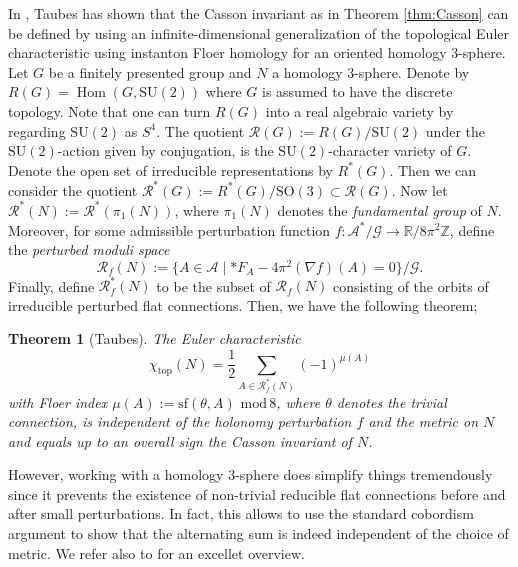 \documentclass[11pt,colorinlistoftodos]{amsart}
\numberwithin{equation}{subsection}
\theoremstyle{plain}
\newtheorem{thm}{Theorem}[subsection]
\theoremstyle{definition}
\theoremstyle{remark}
\newcommand{\R}{\mathbb{R}}
\newcommand{\Z}{\mathbb{Z}}
\newcommand{\calR}{\mathcal{R}}
\DeclareMathOperator{\Hom}{Hom}
\newcommand{\calA}{\mathcal{A}}
\begin{document}
In \cite{Taubes1990}, Taubes has shown that the Casson invariant as in Theorem \ref{thm:Casson} can be defined by using an infinite-dimensional generalization of the topological Euler characteristic using instanton Floer homology for an oriented homology 3-sphere. Let $G$ be a finitely presented group and $N$ a homology 3-sphere. Denote by $R(G)=\Hom(G,\mathrm{SU}(2))$ where $G$ is assumed to have the discrete topology. Note that one can turn $R(G)$ into a real algebraic variety by regarding $\mathrm{SU}(2)$ as $S^4$. The quotient $\calR(G):=R(G)/\mathrm{SU}(2)$ under the $\mathrm{SU}(2)$-action given by conjugation, is the $\mathrm{SU}(2)$-character variety of $G$. Denote the open set of irreducible representations by $R^*(G)$. Then we can consider the quotient $\calR^*(G):=R^*(G)/\mathrm{SO}(3)\subset \calR(G)$. Now let $\mathcal{R}^*(N):=\calR^*(\pi_1(N))$, where $\pi_1(N)$ denotes the \emph{fundamental group} of $N$. Moreover, for some admissible perturbation function $f\colon \calA^*/\mathcal{G}\to \R/8\pi^2\Z$, define the \emph{perturbed moduli space}
\[
\calR_f(N):=\{A \in \calA\mid *F_A-4\pi^2(\nabla f)(A)=0\}/\mathcal{G}.
\]
Finally, define $\calR^*_f(N)$ to be the subset of $\calR_f(N)$ consisting of the orbits of irreducible perturbed flat connections.
Then, we have the following theorem;
\begin{thm}[Taubes\cite{Taubes1990}] 
The Euler characteristic
\[
\chi_\mathrm{top}(N)=\frac{1}{2}\sum_{A\in \mathcal{R}^*_f(N)}(-1)^{\mu(A)}
\]
with \emph{Floer index} $\mu(A):=\mathrm{sf}(\theta,A)\,\,\mathrm{mod}\,8$, where $\theta$ denotes the trivial connection, is independent of the holonomy perturbation $f$ and the metric on $N$ and equals up to an overall sign the Casson invariant of $N$.
\end{thm}
However, working with a homology 3-sphere does simplify things tremendously since it prevents the existence of non-trivial reducible flat connections before and after small perturbations. In fact, this allows to use the standard cobordism argument to show that the alternating sum is indeed independent of the choice of metric. We refer also to \cite{Saveliev2001} for an excellet overview.  
\end{document}
